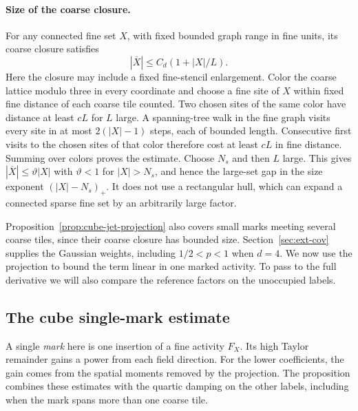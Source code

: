 \documentclass[11pt]{article}
\theoremstyle{definition}
\begin{document}
\paragraph{Size of the coarse closure.}
For any connected fine set \(X\), with fixed bounded graph range
in fine units, its coarse closure satisfies
\begin{equation}
 |\overline X|\le C_d(1+|X|/L).
\end{equation}
Here the closure may include a fixed fine-stencil enlargement.
Color the coarse lattice modulo three in every coordinate
and choose a fine site of \(X\) within fixed fine distance
of each coarse tile counted. Two chosen sites of the same
color have distance at least \(cL\) for \(L\) large.
A spanning-tree walk in the fine graph visits every site in
at most \(2(|X|-1)\) steps, each of bounded length.
Consecutive first visits to the chosen sites of that color
therefore cost at least \(cL\) in fine distance. Summing over
colors proves the estimate. Choose \(N_s\) and then \(L\)
large. This gives \(|\overline X|\le\vartheta|X|\) with
\(\vartheta<1\) for \(|X|>N_s\), and hence the large-set gap
in the size exponent \((|X|-N_s)_+\). It does not use a
rectangular hull, which can expand a connected sparse fine
set by an arbitrarily large factor.

Proposition~\ref{prop:cube-jet-projection} also covers small marks
meeting several coarse tiles, since their coarse closure has bounded
size. Section~\ref{sec:ext-cov} supplies the Gaussian weights,
including \(1/2<p<1\) when \(d=4\). We now use the projection to
bound the term linear in one marked activity. To pass to the full
derivative we will also compare the reference factors on the
unoccupied labels.

\subsection{The cube single-mark estimate}
\label{sec:cube-mark}

A single \emph{mark} here is one insertion of a fine activity
\(F_X\). Its high Taylor remainder gains a power from each field
direction. For the lower coefficients, the gain comes from the
spatial moments removed by the projection. The proposition combines
these estimates with the quartic damping on the other labels,
including when the mark spans more than one coarse tile.
\end{document}
